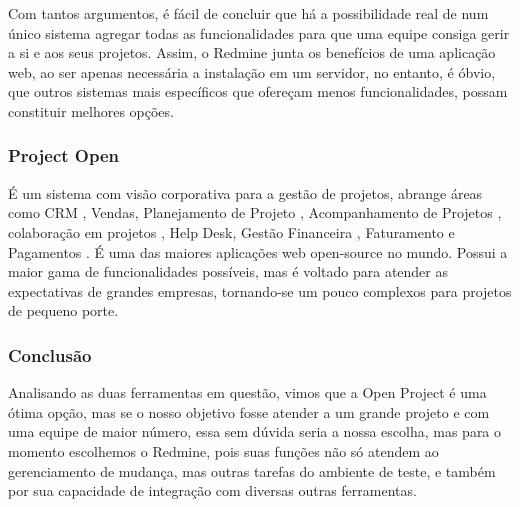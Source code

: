 \documentclass[12pt,a4paper]{article}
\begin{document}
			Com tantos argumentos, é fácil de concluir que há a possibilidade real  de num único sistema agregar todas as funcionalidades para que uma equipe consiga gerir a si e aos seus projetos. Assim, o Redmine junta os benefícios de uma aplicação  web, ao ser apenas necessária a instalação em um servidor, no entanto, é óbvio, que outros sistemas  mais específicos  que ofereçam  menos  funcionalidades, possam constituir melhores opções.
		
		\subsubsection{Project Open}
		
			É um sistema com visão corporativa para a gestão de projetos, abrange áreas como CRM , Vendas, Planejamento de Projeto , Acompanhamento de Projetos , colaboração em projetos ,  Help Desk, Gestão Financeira , Faturamento e Pagamentos . É uma das maiores aplicações web open-source no mundo. Possui a maior gama de funcionalidades possíveis, mas é voltado para atender as expectativas de grandes empresas, tornando-se um pouco complexos para projetos de pequeno porte.
		
		\subsubsection{Conclusão}
		
			Analisando as duas ferramentas em questão, vimos que a Open Project é uma ótima opção, mas se o nosso objetivo fosse atender a um grande projeto e com uma equipe de maior número, essa sem dúvida seria a nossa escolha, mas para o momento escolhemos o Redmine, pois suas funções não só atendem ao gerenciamento de mudança, mas outras tarefas do ambiente de teste, e também por sua capacidade de integração com diversas outras ferramentas.
		

\clearpage
\nocite{*}
		
		
\end{document}
